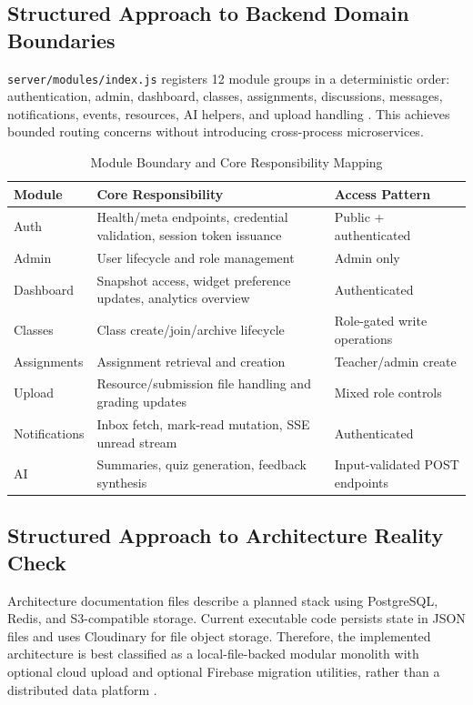 \subsection{Structured Approach to Backend Domain Boundaries}

\texttt{server/modules/index.js} registers 12 module groups in a deterministic order: authentication, admin, dashboard, classes, assignments, discussions, messages, notifications, events, resources, AI helpers, and upload handling \cite{repo-server-modules}. This achieves bounded routing concerns without introducing cross-process microservices.

\begin{table}[h]
\centering
\caption{Module Boundary and Core Responsibility Mapping}
\begin{tabularx}{\linewidth}{>{\raggedright\arraybackslash}p{3.2cm} >{\raggedright\arraybackslash}X >{\raggedright\arraybackslash}p{3.1cm}}
\toprule
Module & Core Responsibility & Access Pattern \\
\midrule
Auth & Health/meta endpoints, credential validation, session token issuance & Public + authenticated \\
Admin & User lifecycle and role management & Admin only \\
Dashboard & Snapshot access, widget preference updates, analytics overview & Authenticated \\
Classes & Class create/join/archive lifecycle & Role-gated write operations \\
Assignments & Assignment retrieval and creation & Teacher/admin create \\
Upload & Resource/submission file handling and grading updates & Mixed role controls \\
Notifications & Inbox fetch, mark-read mutation, SSE unread stream & Authenticated \\
AI & Summaries, quiz generation, feedback synthesis & Input-validated POST endpoints \\
\bottomrule
\end{tabularx}
\end{table}

\subsection{Structured Approach to Architecture Reality Check}

Architecture documentation files describe a planned stack using PostgreSQL, Redis, and S3-compatible storage. Current executable code persists state in JSON files and uses Cloudinary for file object storage. Therefore, the implemented architecture is best classified as a local-file-backed modular monolith with optional cloud upload and optional Firebase migration utilities, rather than a distributed data platform \cite{repo-store,repo-upload,firebase-admin-docs}.
